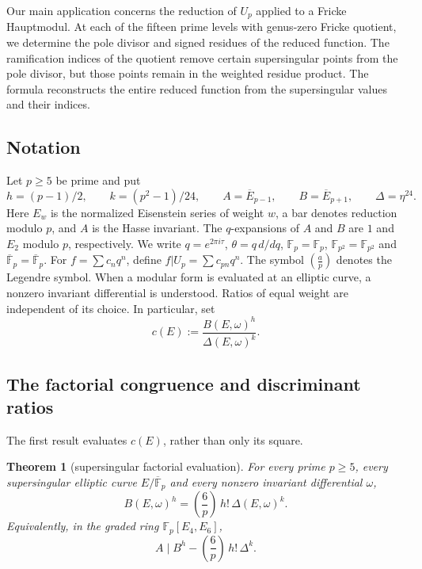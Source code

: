 \documentclass[11pt,a4paper]{article}
\numberwithin{equation}{section}
\newtheorem{theorem}{Theorem}[section]
\theoremstyle{definition}
\theoremstyle{remark}
\newcommand{\Fp}{\mathbb F_p}
\newcommand{\Fq}{\mathbb F_{p^2}}
\newcommand{\Fb}{\overline{\mathbb F}_p}
\newcommand{\Lp}[1]{\left(\frac{#1}{p}\right)}
\begin{document}
Our main application concerns the reduction of $U_p$ applied to a
Fricke Hauptmodul. At each of the fifteen prime levels with genus-zero
Fricke quotient, we determine the pole divisor and signed residues of
the reduced function. The ramification indices of the quotient remove
certain supersingular points from the pole divisor, but those points
remain in the weighted residue product. The formula reconstructs the
entire reduced function from the supersingular values and their indices.

\subsection{Notation}
Let $p\ge5$ be prime and put
\[
h=(p-1)/2,\qquad k=(p^2-1)/24,\qquad
A=\overline E_{p-1},\qquad B=\overline E_{p+1},\qquad
\Delta=\eta^{24}.
\]
Here $E_w$ is the normalized Eisenstein series of weight $w$, a bar
denotes reduction modulo $p$, and $A$ is the Hasse invariant. The
$q$-expansions of $A$ and $B$ are $1$ and $E_2$ modulo $p$,
respectively. We write $q=e^{2\pi i\tau}$, $\theta=q\,d/dq$,
$\Fp=\mathbb F_p$, $\Fq=\mathbb F_{p^2}$ and
$\Fb=\overline{\mathbb F}_p$.
For $f=\sum c_nq^n$, define $f|U_p=\sum c_{pn}q^n$.
The symbol $\left(\frac{a}{p}\right)$ denotes the Legendre symbol.
When a modular form is evaluated at an elliptic curve, a nonzero
invariant differential is understood. Ratios of equal weight are
independent of its choice. In particular, set
\[
c(E):=\frac{B(E,\omega)^h}{\Delta(E,\omega)^k}.
\]

\subsection{The factorial congruence and discriminant ratios}
The first result evaluates $c(E)$, rather than only its square.

\begin{theorem}[supersingular factorial evaluation]\label{thm:factorial}
For every prime $p\ge5$, every supersingular elliptic curve $E/\Fb$ and
every nonzero invariant differential $\omega$,
\begin{equation}\label{eq:factorial-evaluation}
B(E,\omega)^h=\Lp6\,h!\,\Delta(E,\omega)^k.
\end{equation}
Equivalently, in the graded ring $\Fp[E_4,E_6]$,
\begin{equation}\label{eq:factorial-divisibility}
A\mid B^h-\Lp6\,h!\,\Delta^k.
\end{equation}
\end{theorem}
\end{document}
